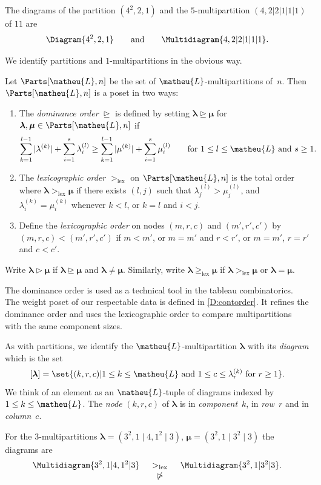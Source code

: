 \documentclass[a4paper,11pt]{amsart}
\let\gedom=\trianglerighteq
\let\gdom=\vartriangleright
\newcommand\blam{{\boldsymbol\lambda}}
\newcommand\bmu{{\boldsymbol\mu}}
\numberwithin{equation}{subsection}
\theoremstyle{definition}
\theoremstyle{theorem}
\theoremstyle{remark}
\newcommand\sL{\matheu{L}}
\begin{document}
  \begin{Example}
  The diagrams of
  the partition $(4^2,2,1)$ and the $5$-multipartition $(4,2|2|1|1|1)$ of $11$ are
  \[
        \Diagram{4^2,2,1}\quad \quad\text{and}\quad\quad \Multidiagram{4,2|2|1|1|1}.
  \]
  \end{Example}
We identify partitions and $1$-multipartitions in the obvious way.
\begin{Definition}\label{Defmultipart}
  Let $\Parts[\sL,n]$ be the set of $\sL$-multipartitions of~$n$.
  Then $\Parts[\sL,n]$ is a poset in two ways:
  \begin{enumerate}
 \item The \emph{dominance order} $\gedom$ is defined by setting
   $\blam\gedom\bmu$ for $\blam,\bmu\in\Parts[\sL,n]$ if
  \[
        \sum_{k=1}^{l-1}|\lambda^{(k)}| +\sum_{i=1}^s\lambda^{(l)}_i
           \ge\sum_{k=1}^{l-1}|\mu^{(k)}|+\sum_{i=1}^s\mu^{(l)}_i
           \qquad\text{for $1\le l\le \sL$ and $s\ge1$.}
  \]
  \item  The \emph{lexicographic order} $>_{\mathrm{lex}}$ on $\Parts[\sL,n]$ is the total order where
  $\blam>_{\mathrm{lex}}\bmu$ if there exists $(l,j)$ such that
  $\lambda^{(l)}_j>\mu^{(l)}_j$, and $\lambda^{(k)}_i=\mu^{(k)}_i$
  whenever $k<l$, or $k=l$ and $i<j$.
  \item Define the \emph{lexicographic order} on nodes $(m,r,c)$ and
  $(m',r',c')$ by $(m,r,c)<(m',r',c')$ if $m<m'$, or $m=m'$ and $r<r'$,
  or $m=m'$, $r=r'$ and $c<c'$.
  \end{enumerate}
    Write $\blam\gdom\bmu$ if $\blam\gedom\bmu$ and $\blam\ne\bmu$.  Similarly, write $\blam\ge_{\mathrm{lex}}\bmu$ if $\blam>_{\mathrm{lex}}\bmu$ or $\blam=\bmu$.
  \end{Definition}
  The dominance order is used as a technical tool in the tableau combinatorics. The weight poset of our respectable data is defined in \autoref{D:contorder}. It refines the dominance order and uses the lexicographic order to compare multipartitions with the same component sizes.

  As with partitions, we identify the $\sL$-multipartition $\blam$ with its
 \emph{diagram} which is the set
 \[
    [\blam]=\set{(k,r,c)|1\le k\le \sL\text{ and }1\le c\le \lambda^{(k)}_r\text{ for }r\ge1}.
 \]
 We think of an element as an $\sL$-tuple of diagrams indexed by $1\le k\le \sL$.
 The \emph{node} $(k,r,c)$ of $\blam$
 is in \emph{component}~$k$, in \emph{row}~$r$ and in \emph{column}~$c$.
 \begin{Example}
For the $3$-multipartitions $\blam=(3^2,1\mid4,1^2\mid3)$,  $\bmu=(3^2,1\mid 3^2\mid3)$ the diagrams are
 \[
        \Multidiagram{3^2,1|4,1^2|3}\quad
        \begin{array}[t]{c}
        >_{\mathrm{lex}}\\
        \not\gdom
        \end{array}
        \quad\Multidiagram{3^2,1|3^2|3}.
 \]
 \end{Example}
\end{document}
